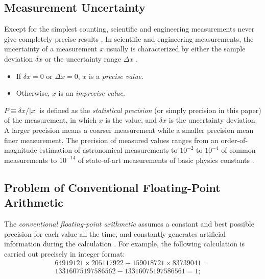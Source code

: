 \documentclass[twoside]{article}
\numberwithin{equation}{section}
\begin{document}
\subsection{Measurement Uncertainty}

Except for the simplest counting, scientific and engineering measurements never give completely precise results \cite{Statistical_Methods}\cite{Precisions_Physical_Measurements}. 
In scientific and engineering measurements, the uncertainty of a measurement $x$ usually is characterized by either the sample deviation $\delta x$ or the uncertainty range $\Delta x$ \cite{Statistical_Methods}\cite{Precisions_Physical_Measurements}.
\begin{itemize}
\item If $\delta x = 0$ or $\Delta x = 0$, $x$ is a \emph{precise value}.

\item Otherwise, $x$ is an \emph{imprecise value}.
\end{itemize}
 
$P \equiv \delta x / |x|$ is defined as the \emph{statistical precision} (or simply precision in this paper) of the measurement, in which $x$ is the value, and $\delta x$ is the uncertainty deviation.
A larger precision means a coarser measurement while a smaller precision mean finer measurement.
The precision of measured values ranges from an order-of-magnitude estimation of astronomical measurements to $10^{-2}$ to $10^{-4}$ of common measurements to $10^{-14}$ of state-of-art measurements of basic physics constants \cite{Basic_Constants_Measurements}.  



\subsection{Problem of Conventional Floating-Point Arithmetic}

The \emph{conventional floating-point arithmetic} \cite{Computer_Architecture}\cite{Floating_Point_Arithmetic}\cite{Floating_Point_Standard} assumes a constant and best possible precision for each value all the time, and constantly generates artificial information during the calculation \cite{Arithmetic_Digital_Computers}.  
For example, the following calculation is carried out precisely in integer format:
\begin{multline}
\label{eqn: int num calc}
64919121 \times 205117922 - 159018721 \times 83739041=\\
13316075197586562 - 13316075197586561 = 1;
\end{multline}
\end{document}
